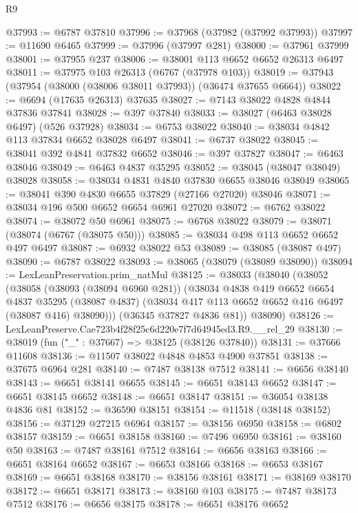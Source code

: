 \begin{lexlean}{R9}
\begin{coremodule}
@37993 := @6787 @37810
@37996 := @37968 (@37982 (@37992 @37993))
@37997 := @11690 @6465
@37999 := @37996 (@37997 @281)
@38000 := @37961 @37999
@38001 := @37955 @237
@38006 := @38001 @113 @6652 @6652 @26313 @6497
@38011 := @37975 @103 @26313 (@6767 (@37978 @103))
@38019 := @37943 (@37954 (@38000 (@38006 @38011 @37993)) (@36474 @37655 @6664))
@38022 := @6694 (@17635 @26313) @37635
@38027 := @7143 @38022 @4828 @4844 @37836 @37841
@38028 := @397 @37840
@38033 := @38027 (@6463 @38028 @6497) (@526 @37928)
@38034 := @6753 @38022
@38040 := @38034 @4842 @113 @37834 @6652 @38028 @6497
@38041 := @6737 @38022
@38045 := @38041 @392 @4841 @37832 @6652
@38046 := @397 @37827
@38047 := @6463 @38046
@38049 := @6463 @4837 @35295
@38052 := @38045 (@38047 @38049) @38028
@38058 := @38034 @4831 @4840 @37830 @6655 @38046 @38049
@38065 := @38041 @390 @4830 @6655 @37829 (@27166 @27020) @38046
@38071 := @38034 @196 @500 @6652 @6654 @6961 @27020
@38072 := @6762 @38022
@38074 := @38072 @50 @6961
@38075 := @6768 @38022
@38079 := @38071 (@38074 (@6767 (@38075 @50)))
@38085 := @38034 @498 @113 @6652 @6652 @497 @6497
@38087 := @6932 @38022 @53
@38089 := @38085 (@38087 @497)
@38090 := @6787 @38022
@38093 := @38065 (@38079 (@38089 @38090))
@38094 := LexLeanPreservation.prim_natMul
@38125 := @38033
    (@38040
      (@38052
        (@38058
          (@38093 (@38094 @6960 @281))
          (@38034
            @4838
            @419
            @6652
            @6654
            @4837
            @35295
            (@38087 @4837)
            (@38034 @417 @113 @6652 @6652 @416 @6497 (@38087 @416) @38090)))
        (@36345 @37827 @4836 @81))
      @38090)
@38126 := LexLeanPreserve.Cae723b4f28f25c6d220e7f7d64945ed3.R9.__rel_29
@38130 := @38019 (fun ("_" : @37667) => @38125 (@38126 @37840))
@38131 := @37666 @11608
@38136 := @11507 @38022 @4848 @4853 @4900 @37851
@38138 := @37675 @6964 @281
@38140 := @7487 @38138 @7512
@38141 := @6656 @38140
@38143 := @6651 @38141 @6655
@38145 := @6651 @38143 @6652
@38147 := @6651 @38145 @6652
@38148 := @6651 @38147
@38151 := @36054 @38138 @4836 @81
@38152 := @36590 @38151
@38154 := @11518 (@38148 @38152)
@38156 := @37129 @27215 @6964
@38157 := @38156 @6950
@38158 := @6802 @38157
@38159 := @6651 @38158
@38160 := @7496 @6950
@38161 := @38160 @50
@38163 := @7487 @38161 @7512
@38164 := @6656 @38163
@38166 := @6651 @38164 @6652
@38167 := @6653 @38166
@38168 := @6653 @38167
@38169 := @6651 @38168
@38170 := @38156 @38161
@38171 := @38169 @38170
@38172 := @6651 @38171
@38173 := @38160 @103
@38175 := @7487 @38173 @7512
@38176 := @6656 @38175
@38178 := @6651 @38176 @6652

\end{coremodule}
\end{lexlean}
